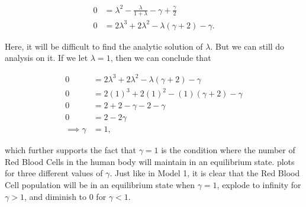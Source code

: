 \begin{align}
    0 &= \lambda^2 - \frac{\lambda}{1 + \lambda} - \gamma + \frac{\gamma}{2} \nonumber\\
    0 &= 2\lambda^3+2\lambda^2-\lambda(\gamma+2)-\gamma. \label{eq:2nonlinear-difference-model-characteristic-equation}
\end{align}

Here, it will be difficult to find the analytic solution of $\lambda$. But we can still do analysis on it. If we let $\lambda = 1$, then we can conclude that

\begin{align}
    0 &= 2\lambda^3 + 2\lambda^2 - \lambda(\gamma + 2) - \gamma \nonumber\\
    0 &= 2(1)^3 + 2(1)^2 - (1)(\gamma+2) - \gamma \nonumber\\
    0 &= 2 + 2 - \gamma - 2 - \gamma \nonumber\\
    0 &= 2 - 2\gamma \nonumber\\
    \implies \gamma &= 1, \label{eq:nonlinear-difference-model-param-val}
\end{align}

which further supports the fact that $\gamma = 1$ is the condition where the number of Red Blood Cells in the human body will maintain in an equilibrium state.  plots  for three different values of $\gamma$. Just like in Model 1, it is clear that the Red Blood Cell population will be in an equilibrium state when $\gamma = 1$, explode to infinity for $\gamma > 1$, and diminish to 0 for $\gamma < 1$.

